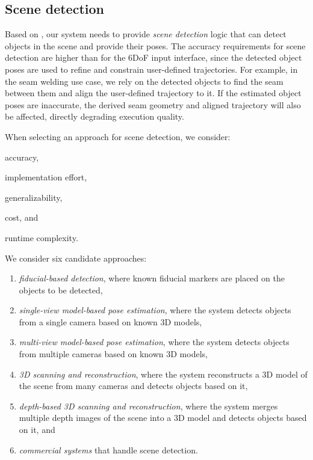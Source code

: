 \subsection{Scene detection} \label{subsec:ch2_analysis_scene_detection}

Based on , our system needs to provide \emph{scene detection} logic that can detect objects in the scene and provide their poses. The accuracy requirements for scene detection are higher than for the 6DoF input interface, since the detected object poses are used to refine and constrain user-defined trajectories. For example, in the seam welding use case, we rely on the detected objects to find the seam between them and align the user-defined trajectory to it. If the estimated object poses are inaccurate, the derived seam geometry and aligned trajectory will also be affected, directly degrading execution quality. \DIFaddbegin {}\DIFaddend 

When selecting an approach for scene detection, we consider:
\begin{enumerate*}[label=(\roman*)]
    \item accuracy,
    \item implementation effort,
    \item generalizability,
    \item cost, and
    \item runtime complexity.
\end{enumerate*}

We consider six candidate approaches:
\begin{enumerate}[label=(\roman*)]
    \item \emph{fiducial-based detection}, where known fiducial markers are placed on the objects to be detected,
    \item \emph{single-view model-based pose estimation}, where the system detects objects from a single camera based on known 3D models, \label{req:single_view_model_based_pose_estimation}
    \item \emph{multi-view model-based pose estimation}, where the system detects objects from multiple cameras based on known 3D models, \label{req:multi_view_model_based_pose_estimation}
    \item \emph{3D scanning and reconstruction}, where the system reconstructs a 3D model of the scene from many cameras and detects objects based on it, \label{req:3D_scanning_and_reconstruction}
    \item \emph{depth-based 3D scanning and reconstruction}, where the system merges multiple depth images of the scene into a 3D model and detects objects based on it, and \label{req:depth_based_3D_scanning_and_reconstruction}
    \item \emph{commercial systems} that handle scene detection.
\end{enumerate}

